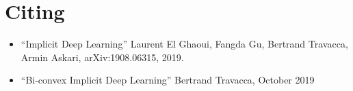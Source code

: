 \documentclass[letterpaper,10pt,english]{sphinxmanual}
\begin{document}
\chapter{Citing}
\label{\detokenize{sections/citing:citing}}\label{\detokenize{sections/citing:id1}}\label{\detokenize{sections/citing::doc}}\begin{itemize}
\item {} 
“Implicit Deep Learning” Laurent El Ghaoui, Fangda Gu, Bertrand Travacca, Armin Askari, arXiv:1908.06315, 2019.

\item {} 
“Bi-convex Implicit Deep Learning” Bertrand Travacca, October 2019

\end{itemize}
\end{document}
